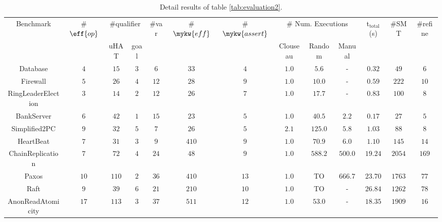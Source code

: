 \begin{table}[t!]
  \renewcommand{\arraystretch}{0.8}
  \caption{\small Detail results of table \ref{tab:evaluation2}.}
\vspace*{-.1in}
\footnotesize
\setlength{\tabcolsep}{3.3pt}
\begin{tabular}{c||ccc||ccc||ccc||c|cc}
  \toprule
Benchmark & \#$\eff{op}$ & \multicolumn{2}{c||}{\#qualifier} & \#var &\#$\mykw{eff}$ & \#$\mykw{assert}$ & \multicolumn{3}{c||}{\scriptsize \# Num. Executions} & t$_\text{total}$(s) & \#SMT & \#refine \\
 &  &uHAT &goal & & & & {\scriptsize Clouseau} & {\scriptsize Random} & {\scriptsize Manual} &  &  \\
 \midrule
 {\scriptsize\textsf{Database}} & $4$ & $15$ & $3$ & $6$ & $3$$3$ & $4$ & $1.0$ & $5.6$ & - & $0.32$ & $49$ & $6$\\
 \midrule
{\scriptsize\textsf{Firewall}}\cite{MessageChain} & $5$ & $26$ & $4$ & $12$ & $2$$8$ & $9$ & $1.0$ & $10.0$ & - & $0.59$ & $222$ & $10$\\
\midrule
{\scriptsize\textsf{RingLeaderElection}}\cite{MessageChain} & $3$ & $14$ & $2$ & $12$ & $2$$6$ & $7$ & $1.0$ & $17.7$ & - & $0.83$ & $100$ & $8$\\
\midrule
{\scriptsize\textsf{BankServer}}\cite{DGJ+13} & $6$ & $42$ & $1$ & $15$ & $2$$3$ & $5$ & $1.0$ & $40.5$ & $2.2$ & $0.17$ & $27$ & $5$\\
\midrule
{\scriptsize\textsf{Simplified2PC}}\cite{DGJ+13} & $9$ & $32$ & $5$ & $7$ & $2$$6$ & $5$ & $2.1$ & $125.0$ & $5.8$ & $1.03$ & $88$ & $8$\\
\midrule
{\scriptsize\textsf{HeartBeat}}\cite{DGJ+13} & $7$ & $31$ & $3$ & $9$ & $4$$10$ & $9$ & $1.0$ & $70.9$ & $6.0$ & $1.10$ & $145$ & $14$\\
\midrule
{\scriptsize\textsf{ChainReplication}}\cite{ModP} & $7$ & $72$ & $4$ & $24$ & $4$$8$ & $9$ & $1.0$ & $588.2$ & $500.0$ & $19.24$ & $2054$ & $169$\\
\midrule
{\scriptsize\textsf{Paxos}}\cite{ModP} & $10$ & $110$ & $2$ & $36$ & $4$$10$ & $13$ & $1.0$ & {\tiny TO} & $666.7$ & $23.70$ & $1763$ & $77$\\
\midrule
{\scriptsize\textsf{Raft}} & $9$ & $39$ & $6$ & $21$ & $2$$10$ & $10$ & $1.0$ & {\tiny TO} & - & $26.84$ & $1262$ & $78$\\
\midrule
{\scriptsize\textsf{AnonReadAtomicity}} & $17$ & $113$ & $3$ & $37$ & $5$$11$ & $12$ & $1.0$ & $53.0$ & - & $18.35$ & $1909$ & $16$\\
\bottomrule
\end{tabular}
\label{tab:evaluation-detail2}
\end{table}

